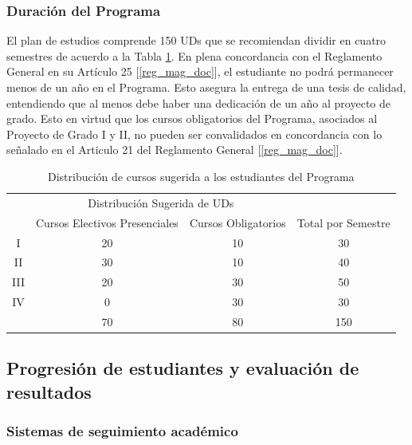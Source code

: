 \subsubsection{Duración del Programa}

El plan de estudios comprende 150 UDs que se recomiendan dividir en cuatro semestres de acuerdo
a la Tabla \ref{distribucion_uds}. En plena concordancia con el Reglamento General en su Artículo 25 [\ref{reg_mag_doc}], el
estudiante no podrá permanecer menos de un año en el Programa. Esto asegura la entrega de una
tesis de calidad, entendiendo que al menos debe haber una dedicación de un año al proyecto de grado.
Esto en virtud que los cursos obligatorios del Programa, asociados al Proyecto de Grado I y II, no pueden
ser convalidados en concordancia con lo señalado en el Articulo 21 del Reglamento General [\ref{reg_mag_doc}].

\begin{table}[!ht]
\centering
\caption{Distribución de cursos sugerida a los estudiantes del Programa}
\label{distribucion_uds}
\begin{tabular}{cccc}
\hline
& \multicolumn{2}{c}{Distribución Sugerida de UDs}    &                    \\ \cline{2-3}
& Cursos Electivos Presenciales & Cursos Obligatorios & Total por Semestre \\ \hline \hline
I   & 20                            & 10                  & 30                 \\
II  & 30                            & 10                  & 40                 \\
III & 20                            & 30                  & 50                 \\
IV  & 0                             & 30                  & 30                 \\
& 70                            & 80                  & 150                \\ \hline
\end{tabular}
\end{table}

\subsection{Progresión de estudiantes y evaluación de resultados}\label{prog_eval}

\subsubsection{Sistemas de seguimiento académico}

